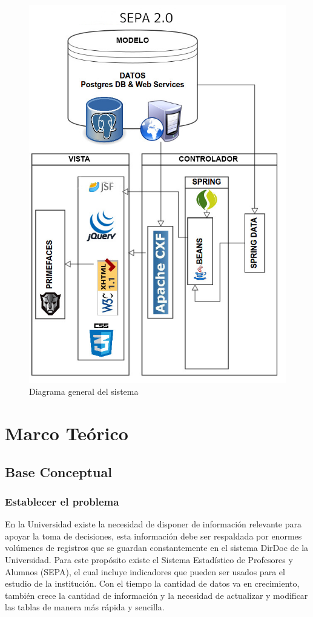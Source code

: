 \documentclass[a4paper,12pt,openany,oneside]{book}
\begin{document}
\begin{figure}[!hbp]
\begin{center}
\includegraphics[scale=0.6,angle=0]{images/diagrama2.jpg}
\caption{Diagrama general del sistema}
\label{Diagrama general del sistema}
\end{center}
\end{figure}
\chapter{Marco Teórico}
\thispagestyle{empty}
\section{Base Conceptual}
\subsection{Establecer el problema}
En la Universidad existe la necesidad de disponer de información relevante para apoyar la toma de decisiones, esta información debe ser respaldada por enormes volúmenes de registros que se guardan constantemente en el sistema DirDoc de la Universidad. Para este propósito existe el Sistema Estadístico de Profesores y Alumnos (SEPA), el cual incluye indicadores que pueden ser usados para el estudio de la institución. Con el tiempo la cantidad de datos va en crecimiento, también crece la cantidad de información y la necesidad de actualizar y modificar las tablas de manera más rápida y sencilla.
\end{document}
